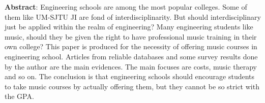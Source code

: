 \textbf{Abstract}: Engineering schools are among the most popular colleges. Some of them like UM-SJTU JI are fond of interdisciplinarity. But should interdisciplinary just be applied within the realm of engineering? Many engineering students like music, should they be given the right to have professional music training in their own college? This paper is produced for the necessity of offering music courses in engineering school. Articles from reliable databases and some survey results done by the author are the main evidences. The main focuses are costs, music therapy and so on. The conclusion is that engineering schools should encourage students to take music courses by actually offering them, but they cannot be so strict with the GPA.
